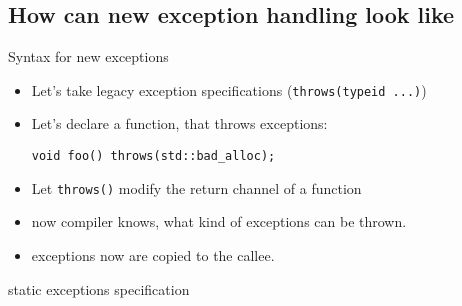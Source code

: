 \documentclass[10pt,a4paper]{beamer}
\begin{document}
	
\subsection{How can new exception handling look like}
\begin{frame}[fragile]{Syntax for new exceptions}
	\begin{itemize}
		\item Let's take legacy exception specifications (\texttt{throws(typeid ...)})
		\item Let's declare a function, that throws exceptions:
		\begin{verbatim}
void foo() throws(std::bad_alloc);
		\end{verbatim}
		\item Let \texttt{throws()} modify the return channel of a function
		\item now compiler knows, what kind of exceptions can be thrown.
		\item exceptions now are {\color{red}copied} to the callee.
	\end{itemize}
\end{frame}

\begin{frame}{static exceptions specification}
	
\end{frame}
	
\end{document}
